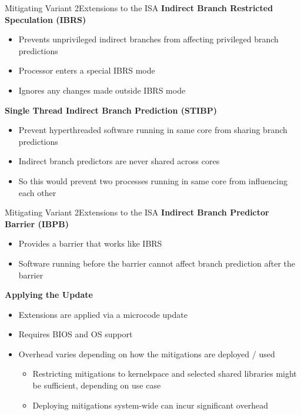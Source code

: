 \documentclass[10pt, dvipsnames, aspectratio=169]{beamer}
\begin{document}
\begin{frame}[c]{Mitigating Variant 2}{Extensions to the ISA}
  {\bf Indirect Branch Restricted Speculation (IBRS)}
  \begin{itemize}
    \item Prevents unprivileged indirect branches from affecting privileged branch predictions
    \item Processor enters a special IBRS mode
    \item Ignores any changes made outside IBRS mode
  \end{itemize}

  \vfill
  {\bf Single Thread Indirect Branch Prediction (STIBP)}
  \begin{itemize}
    \item Prevent hyperthreaded software running in same core from sharing branch predictions
    \item Indirect branch predictors are never shared across cores \cite{intel_stibp}
    \item So this would prevent two processes running in same core from influencing each other
  \end{itemize}
\end{frame}

\begin{frame}[c]{Mitigating Variant 2}{Extensions to the ISA}
  {\bf Indirect Branch Predictor Barrier (IBPB)}
  \begin{itemize}
    \item Provides a barrier that works like IBRS
    \item Software running before the barrier cannot affect branch prediction after the barrier
  \end{itemize}

  \vfill
  {\bf Applying the Update}
  \begin{itemize}
    \item Extensions are applied via a microcode update
    \item Requires BIOS and OS support
    \item Overhead varies depending on how the mitigations are deployed / used
    \begin{itemize}
      \item Restricting mitigations to kernelspace and selected shared libraries might be sufficient, depending on use case
      \item Deploying mitigations system-wide can incur significant overhead
    \end{itemize}
  \end{itemize}
\end{frame}
\end{document}
